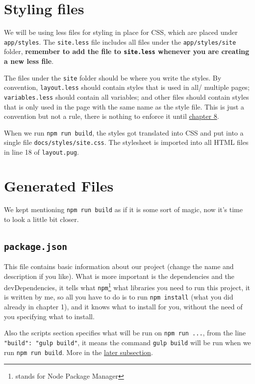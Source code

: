 \section{Styling files}

We will be using less files for styling in place for CSS, which are placed under \texttt{app/styles}. The \texttt{site.less} file includes all files under the \texttt{app/styles/site} folder, \textbf{remember to add the file to \texttt{site.less} whenever you are creating a new less file}. 

The files under the \texttt{site} folder should be where you write the styles. By convention, \texttt{layout.less} should contain styles that is used in all/ multiple pages; \texttt{variables.less} should contain all variables; and other files should contain styles that is only used in the page with the same name as the style file. This is just a convention but not a rule, there is nothing to enforce it until \hyperref[sec:confinestyles]{chapter 8}.

When we run \texttt{npm run build}, the styles got translated into CSS and put into a single file \texttt{docs/styles/site.css}. The stylesheet is imported into all HTML files in line 18 of \texttt{layout.pug}.

\section{Generated Files}

We kept mentioning \texttt{npm run build} as if it is some sort of magic, now it's time to look a little bit closer.

\subsection{\texttt{package.json}}

This file contains basic information about our project (change the name and description if you like). What is more important is the dependencies and the devDependencies, it tells what \texttt{npm}\footnote{stands for Node Package Manager} what libraries you need to run this project, it is written by me, so all you have to do is to run \texttt{npm install} (what you did already in chapter 1), and it knows what to install for you, without the need of you specifying what to install.

Also the scripts section specifies what will be run on \texttt{npm run ...}, from the line \texttt{"build": "gulp build"}, it means the command \texttt{gulp build} will be run when we run \texttt{npm run build}. More in the \hyperref[sec:gulpfile]{later subsection}.

